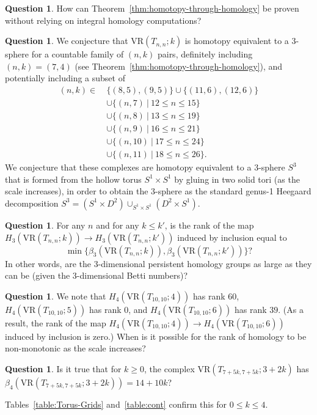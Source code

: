 \documentclass[12pt,a4paper]{amsart}
\theoremstyle{definition}
\newtheorem{question}[theorem]{Question}
\newcommand{\vr}[2]{\mathrm{VR}(#1;#2)}
\numberwithin{equation}{section}
\begin{document}
\begin{question}
How can Theorem~\ref{thm:homotopy-through-homology} be proven without relying on integral homology computations?
\end{question}

\begin{question}
\label{ques:3sphere}
We conjecture that $\vr{T_{n,n}}{k}$ is homotopy equivalent to a $3$-sphere for a countable family of $(n,k)$ pairs, definitely including $(n,k)=(7,4)$ (see Theorem~\ref{thm:homotopy-through-homology}), and potentially including a subset of
\begin{align*}
(n,k)\in\ &\{(8,5),(9,5)\}\cup\{(11,6),(12,6)\} \\
&\cup\{(n,7)~|~12\le n\le 15\} \\
&\cup\{(n,8)~|~13\le n\le 19\} \\
&\cup\{(n,9)~|~16\le n\le 21\} \\
&\cup\{(n,10)~|~17\le n\le 24\} \\
&\cup\{(n,11)~|~18\le n\le 26\}.
\end{align*}
We conjecture that these complexes are homotopy equivalent to a 3-sphere $S^3$ that is formed from the hollow torus $S^1 \times S^1$ by gluing in two solid tori (as the scale increases), in order to obtain the $3$-sphere as the standard genus-1 Heegaard decomposition $S^3=(S^1\times D^2)\cup_{S^1\times S^1}(D^2 \times S^1)$.
\end{question}

\begin{question}
For any $n$ and for any $k\le k'$, is the rank of the map $H_3(\vr{T_{n,n}}{k})\to H_3(\vr{T_{n,n}}{k'})$ induced by inclusion equal to
\[\min\{\beta_3(\vr{T_{n,n}}{k}),\beta_3(\vr{T_{n,n}}{k'})\}?\]
In other words, are the $3$-dimensional persistent homology groups as large as they can be (given the $3$-dimensional Betti numbers)?
\end{question}

\begin{question}
We note that $H_4(\vr{T_{10,10}}{4})$ has rank $60$, $H_4(\vr{T_{10,10}}{5})$ has rank $0$, and $H_4(\vr{T_{10,10}}{6})$ has rank $39$.
(As a result, the rank of the map $H_4(\vr{T_{10,10}}{4})\to H_4(\vr{T_{10,10}}{6})$ induced by inclusion is zero.)
When is it possible for the rank of homology to be non-monotonic as the scale increases?
\end{question}

\begin{question}
Is it true that for $k\geq 0$, the complex $\vr{T_{7+5k,7+5k}}{3+2k}$ has \\$\beta_4(\vr{T_{7+5k,7+5k}}{3+2k})=14+10k$?

Tables~\ref{table:Torus-Grids} and~\ref{table:cont} confirm this for $0\le k\le 4$.
\end{question}
\end{document}
